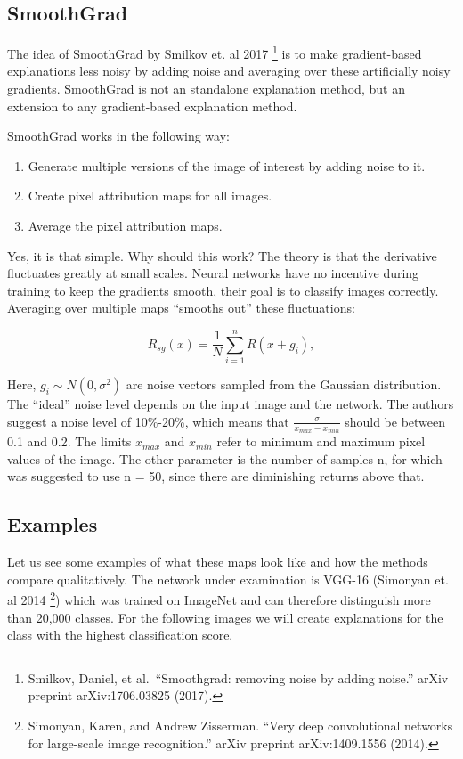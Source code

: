 \documentclass[
  12pt,
]{krantz}
\providecommand{\tightlist}{%
  \setlength{\itemsep}{0pt}\setlength{\parskip}{0pt}}
\begin{document}
\hypertarget{smoothgrad}{%
\subsection{SmoothGrad}\label{smoothgrad}}

The idea of SmoothGrad by Smilkov et. al 2017 \footnote{Smilkov, Daniel, et al.~``Smoothgrad: removing noise by adding noise.'' arXiv preprint arXiv:1706.03825 (2017).} is to make gradient-based explanations less noisy by adding noise and averaging over these artificially noisy gradients.
SmoothGrad is not an standalone explanation method, but an extension to any gradient-based explanation method.

SmoothGrad works in the following way:

\begin{enumerate}
\def\labelenumi{\arabic{enumi}.}
\tightlist
\item
  Generate multiple versions of the image of interest by adding noise to it.
\item
  Create pixel attribution maps for all images.
\item
  Average the pixel attribution maps.
\end{enumerate}

Yes, it is that simple.
Why should this work?
The theory is that the derivative fluctuates greatly at small scales.
Neural networks have no incentive during training to keep the gradients smooth, their goal is to classify images correctly.
Averaging over multiple maps ``smooths out'' these fluctuations:

\[R_{sg}(x)=\frac{1}{N}\sum_{i=1}^n{}R(x+g_i),\]

Here, \(g_i\sim{}N(0,\sigma^2)\) are noise vectors sampled from the Gaussian distribution.
The ``ideal'' noise level depends on the input image and the network.
The authors suggest a noise level of 10\%-20\%, which means that \(\frac{\sigma}{x_{max} - x_{min}}\) should be between 0.1 and 0.2.
The limits \(x_{max}\) and \(x_{min}\) refer to minimum and maximum pixel values of the image.
The other parameter is the number of samples n, for which was suggested to use n = 50, since there are diminishing returns above that.

\hypertarget{examples-6}{%
\subsection{Examples}\label{examples-6}}

Let us see some examples of what these maps look like and how the methods compare qualitatively.
The network under examination is VGG-16 (Simonyan et. al 2014 \footnote{Simonyan, Karen, and Andrew Zisserman. ``Very deep convolutional networks for large-scale image recognition.'' arXiv preprint arXiv:1409.1556 (2014).}) which was trained on ImageNet and can therefore distinguish more than 20,000 classes.
For the following images we will create explanations for the class with the highest classification score.
\end{document}
